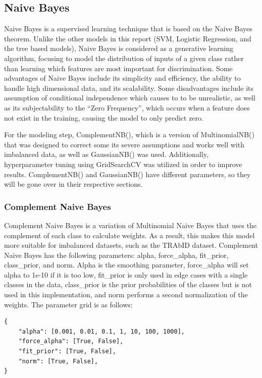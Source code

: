 \documentclass[journal]{IEEEtran}
\begin{document}
\subsection{Naive Bayes}

Naive Bayes is a supervised learning technique that is based on the Naive Bayes theorem. Unlike the other models in this report (SVM, Logistic Regression, and the tree based models), Naive Bayes is considered as a generative learning algorithm, focusing to model the distribution of inputs of a given class rather than learning which features are most important for discrimination. Some advantages of Naive Bayes include its simplicity and efficiency, the ability to handle high dimensional data, and its scalability. Some disadvantages include its assumption of conditional independence which causes to to be unrealistic, as well as its subjectability to the ``Zero Frequency'', which occurs when a feature does not exist in the training, causing the model to only predict zero.

For the modeling step, ComplementNB(), which is a version of MultinomialNB() that was designed to correct some its severe assumptions and works well with imbalanced data, as well as GaussianNB() was used. Additionally, hyperparameter tuning using GridSearchCV was utilized in order to improve results. ComplementNB() and GaussianNB() have different parameters, so they will be gone over in their respective sections.

\subsubsection{Complement Naive Bayes}
Complement Naive Bayes is a variation of Multinomial Naive Bayes that uses the complement of each class to calculate weights. As a result, this makes this model more suitable for imbalanced datasets, such as the TRAbID dataset. Complement Naive Bayes has the following parameters: alpha, force\_alpha, fit\_prior, class\_prior, and norm. Alpha is the smoothing parameter, force\_alpha will set alpha to 1e-10 if it is too low, fit\_prior is only used in edge cases with a single classes in the data, class\_prior is the prior probabilities of the classes but is not used in this implementation, and norm performs a second normalization of the weights. The parameter grid is as follows: 

\begin{lstlisting}
{
    "alpha": [0.001, 0.01, 0.1, 1, 10, 100, 1000],
    "force_alpha": [True, False],
    "fit_prior": [True, False],
    "norm": [True, False],
}
\end{lstlisting}
\end{document}
